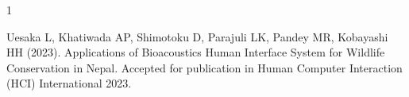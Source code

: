

\begin{雑誌論文}{1}

Uesaka L, Khatiwada AP, Shimotoku D, Parajuli LK, Pandey MR, Kobayashi HH (2023). Applications of Bioacoustics Human Interface System for Wildlife Conservation in Nepal. Accepted for publication in Human Computer Interaction (HCI) International 2023.

\end{雑誌論文}
